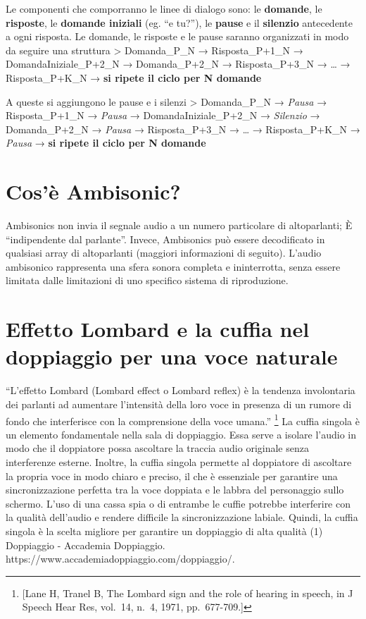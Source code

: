 \documentclass[
]{article}
\begin{document}
Le componenti che comporranno le linee di dialogo sono: le \textbf{domande}, le \textbf{risposte}, le \textbf{domande iniziali} (eg. ``e tu?''), le \textbf{pause} e il \textbf{silenzio} antecedente a ogni risposta. Le domande, le risposte e le pause saranno organizzati in modo da seguire una struttura \textgreater{} Domanda\_P\_N → Risposta\_P+1\_N → DomandaIniziale\_P+2\_N → Domanda\_P+2\_N → Risposta\_P+3\_N → \ldots{} → Risposta\_P+K\_N → \textbf{si ripete il ciclo per N domande}

A queste si aggiungono le pause e i silenzi \textgreater{} Domanda\_P\_N → \emph{Pausa} → Risposta\_P+1\_N → \emph{Pausa} → DomandaIniziale\_P+2\_N → \emph{Silenzio} → Domanda\_P+2\_N → \emph{Pausa} → Risposta\_P+3\_N → \ldots{} → Risposta\_P+K\_N → \emph{Pausa} → \textbf{si ripete il ciclo per N domande}

\section{Cos'è Ambisonic?}\label{cosuxe8-ambisonic}

Ambisonics non invia il segnale audio a un numero particolare di altoparlanti; È ``indipendente dal parlante''. Invece, Ambisonics può essere decodificato in qualsiasi array di altoparlanti (maggiori informazioni di seguito). L'audio ambisonico rappresenta una sfera sonora completa e ininterrotta, senza essere limitata dalle limitazioni di uno specifico sistema di riproduzione.

\section{Effetto Lombard e la cuffia nel doppiaggio per una voce naturale}\label{effetto-lombard-e-la-cuffia-nel-doppiaggio-per-una-voce-naturale}

``L'effetto Lombard (Lombard effect o Lombard reflex) è la tendenza involontaria dei parlanti ad aumentare l'intensità della loro voce in presenza di un rumore di fondo che interferisce con la comprensione della voce umana.'' \footnote{{[}Lane H, Tranel B, The Lombard sign and the role of hearing in speech, in J Speech Hear Res, vol.~14, n.~4, 1971, pp.~677-709.{]}} La cuffia singola è un elemento fondamentale nella sala di doppiaggio. Essa serve a isolare l'audio in modo che il doppiatore possa ascoltare la traccia audio originale senza interferenze esterne. Inoltre, la cuffia singola permette al doppiatore di ascoltare la propria voce in modo chiaro e preciso, il che è essenziale per garantire una sincronizzazione perfetta tra la voce doppiata e le labbra del personaggio sullo schermo. L'uso di una cassa spia o di entrambe le cuffie potrebbe interferire con la qualità dell'audio e rendere difficile la sincronizzazione labiale. Quindi, la cuffia singola è la scelta migliore per garantire un doppiaggio di alta qualità (1) Doppiaggio - Accademia Doppiaggio. https://www.accademiadoppiaggio.com/doppiaggio/.
\end{document}
